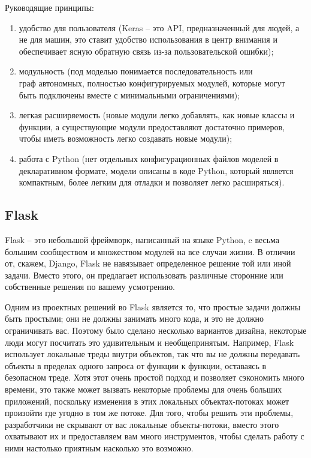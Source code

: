 Руководящие принципы:
\begin{enumerate}
  \item удобство для пользователя (Keras -- это API, предназначенный для людей, а не для машин, это ставит удобство использования в центр внимания и обеспечивает ясную обратную связь из-за пользовательской ошибки);
  \item модульность (под моделью понимается последовательность или \\граф автономных, полностью конфигурируемых модулей, которые могут \\быть подключены вместе с минимальными ограничениями);
  \item легкая расширяемость (новые модули легко добавлять, как новые классы и функции, а существующие модули предоставляют достаточно примеров, чтобы иметь возможность легко создавать новые модули);
  \item работа с Python (нет отдельных конфигурационных файлов моделей в декларативном формате, модели описаны в коде Python, который является компактным, более легким для отладки и позволяет легко расширяться).
\end{enumerate}

\subsection{Flask}
\label{sec:development:flask}

Flask -- это небольшой фреймворк, написанный на языке Python, c весьма большим сообществом и множеством модулей на все случаи жизни. В отличии от, скажем, Django, Flask не навязывает определенное решение той или иной задачи. Вместо этого, он предлагает использовать различные сторонние или собственные решения по вашему усмотрению.

Одним из проектных решений во Flask является то, что простые задачи должны быть простыми; они не должны занимать много кода, и это не должно ограничивать вас. Поэтому было сделано несколько вариантов дизайна, некоторые люди могут посчитать это удивительным и необщепринятым. Например, Flask использует локальные треды внутри объектов, так что вы не должны передавать объекты в пределах одного запроса от функции к функции, оставаясь в безопасном треде. Хотя этот очень простой подход и позволяет сэкономить много времени, это также может вызвать некоторые проблемы для очень больших приложений, поскольку изменения в этих локальных объектах-потоках может произойти где угодно в том же потоке. Для того, чтобы решить эти проблемы, разработчики не скрывают от вас локальные объекты-потоки, вместо этого охватывают их и предоставляем вам много инструментов, чтобы сделать работу с ними настолько приятным насколько это возможно.


